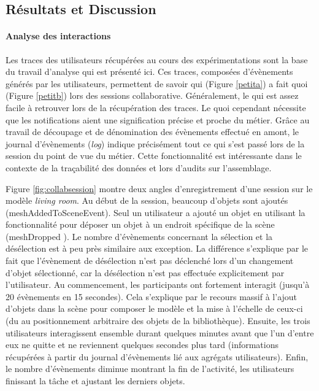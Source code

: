 \subsection{Résultats et Discussion}
\label{sec:res}


\paragraph{Analyse des interactions}
Les traces des utilisateurs récupérées au cours des expérimentations sont la base 
du travail d'analyse qui est présenté ici. Ces traces, composées d'évènements 
générés par les utilisateurs, permettent de savoir qui (Figure \ref{petita}) a fait quoi 
(Figure \ref{petitb}) lors des sessions collaborative. Généralement, le \og qui\fg{} 
est assez facile à retrouver lors de la récupération des traces. Le \og quoi\fg{} 
cependant nécessite que les notifications aient une signification précise et proche 
du métier. Grâce au travail de découpage et de dénomination des évènements 
effectué en amont, le journal d'évènements (\textit{log}) indique précisément tout 
ce 
qui s'est passé lors de la session du point de vue du métier. Cette fonctionnalité est 
intéressante dans le contexte de la traçabilité des données et lors d'audits sur 
l'assemblage. 

Figure \ref{fig:collabsession} montre deux angles d'enregistrement d'une session 
sur le modèle \textit{living room}. Au début de la session, beaucoup d'objets sont 
ajoutés (meshAddedToSceneEvent). Seul un utilisateur a ajouté un objet en 
utilisant la fonctionnalité pour déposer un objet à un endroit spécifique de la scène 
(meshDropped ). Le nombre d'évènements concernant la sélection et 
la désélection est à peu près similaire aux exception. La différence s'explique par 
le fait que l'évènement de désélection n'est pas déclenché lors d'un changement 
d'objet sélectionné, car la désélection n'est pas effectuée explicitement par 
l'utilisateur. Au commencement, les participants ont fortement interagit (jusqu'à 20 
évènements en 15 secondes). Cela s'explique par le recours massif à l'ajout 
d'objets dans la scène pour composer le modèle et la mise à l'échelle de ceux-ci 
(du au positionnement arbitraire des objets de la bibliothèque). Ensuite, les trois 
utilisateurs interagissent ensemble durant quelques minutes avant que l'un d'entre 
eux ne quitte et ne reviennent quelques secondes plus tard (informations 
récupérées à partir du journal d'évènements lié aux agrégats utilisateurs). Enfin, le 
nombre d'évènements diminue montrant la fin de l'activité, les utilisateurs finissant 
la tâche et ajustant les derniers objets.

